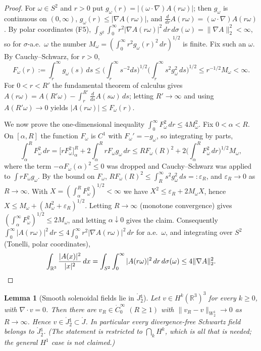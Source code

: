 \documentclass[11pt]{article}
\newtheorem{lemma}[theorem]{Lemma}
\theoremstyle{definition}
\theoremstyle{plain}
\newcommand{\R}{\mathbb R}
\newcommand{\norm}[1]{\lVert #1\rVert}
\begin{document}
\begin{proof}
For $\omega\in S^2$ and $r>0$ put $g_\omega(r)=|(\omega\cdot\nabla)A(r\omega)|$;
then $g_\omega$ is continuous on $(0,\infty)$, $g_\omega(r)\leq|\nabla A(r\omega)|$,
and $\frac{d}{dr}A(r\omega)=(\omega\cdot\nabla)A(r\omega)$.  By polar
coordinates (F5),
$\int_{S^2}\int_0^\infty r^2|\nabla A(r\omega)|^2\,dr\,d\sigma(\omega)
=\norm{\nabla A}_2^2<\infty$, so for $\sigma$-a.e.\ $\omega$ the number
$M_\omega=(\int_0^\infty r^2g_\omega(r)^2\,dr)^{1/2}$ is finite.  Fix such an
$\omega$.  By Cauchy--Schwarz, for $r>0$,
\[
 F_\omega(r):=\int_r^\infty g_\omega(s)\,ds
 \leq\Big(\int_r^\infty s^{-2}ds\Big)^{1/2}
 \Big(\int_r^\infty s^2g_\omega^2\,ds\Big)^{1/2}
 \leq r^{-1/2}M_\omega<\infty .
\]
For $0<r<R'$ the fundamental theorem of calculus gives
$A(r\omega)=A(R'\omega)-\int_r^{R'}\frac{d}{ds}A(s\omega)\,ds$; letting
$R'\to\infty$ and using $A(R'\omega)\to0$ yields
$|A(r\omega)|\leq F_\omega(r)$.

We now prove the one-dimensional inequality
$\int_0^\infty F_\omega^2\,dr\leq4M_\omega^2$.  Fix $0<\alpha<R$.  On
$[\alpha,R]$ the function $F_\omega$ is $C^1$ with $F_\omega'=-g_\omega$, so
integrating by parts,
\[
 \int_\alpha^RF_\omega^2\,dr
 =\big[rF_\omega^2\big]_\alpha^R+2\int_\alpha^R rF_\omega g_\omega\,dr
 \leq RF_\omega(R)^2+2\Big(\int_\alpha^RF_\omega^2\,dr\Big)^{1/2}M_\omega ,
\]
where the term $-\alpha F_\omega(\alpha)^2\leq0$ was dropped and
Cauchy--Schwarz was applied to $\int rF_\omega g_\omega$.  By the bound on
$F_\omega$, $RF_\omega(R)^2\leq\int_R^\infty s^2g_\omega^2\,ds=:\varepsilon_R$,
and $\varepsilon_R\to0$ as $R\to\infty$.  With
$X=(\int_\alpha^RF_\omega^2)^{1/2}<\infty$ we have
$X^2\leq\varepsilon_R+2M_\omega X$, hence
$X\leq M_\omega+(M_\omega^2+\varepsilon_R)^{1/2}$.  Letting $R\to\infty$
(monotone convergence) gives $(\int_\alpha^\infty F_\omega^2)^{1/2}\leq2M_\omega$,
and letting $\alpha\downarrow0$ gives the claim.  Consequently
$\int_0^\infty|A(r\omega)|^2\,dr\leq4\int_0^\infty r^2|\nabla A(r\omega)|^2\,dr$
for a.e.\ $\omega$, and integrating over $S^2$ (Tonelli, polar coordinates),
\[
 \int_{\R^3}\frac{|A(x)|^2}{|x|^2}\,dx
 =\int_{S^2}\int_0^\infty|A(r\omega)|^2\,dr\,d\sigma(\omega)
 \leq4\norm{\nabla A}_2^2 .\qedhere
\]
\end{proof}

\begin{lemma}[Smooth solenoidal fields lie in $\mathring J{}^1_2$]
\label{lem:solenoidal-density}
Let $v\in H^k(\R^3)^3$ for every $k\geq0$, with $\nabla\cdot v=0$.  Then there
are $v_R\in\dot C_0^\infty$ $(R\geq1)$ with $\norm{v_R-v}_{W^1_2}\to0$ as
$R\to\infty$.  Hence $v\in\mathring J{}^1_2\subset\mathring J$.  In
particular every divergence-free Schwartz field belongs to $\mathring J{}^1_2$.
(The statement is restricted to $\bigcap_kH^k$, which is all that is needed;
the general $H^1$ case is not claimed.)
\end{lemma}
\end{document}
